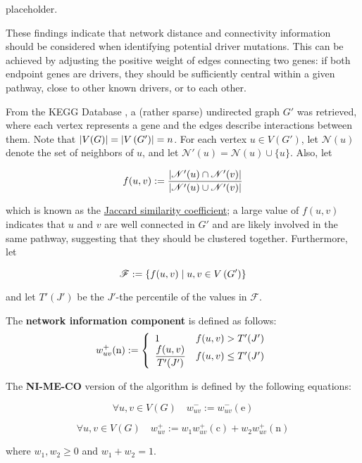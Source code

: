placeholder. 

These findings indicate that network distance and connectivity information should be considered when identifying potential driver mutations. This can be achieved by adjusting the positive weight of edges connecting two genes: if both endpoint genes are drivers, they should be sufficiently central within a given pathway, close to other known drivers, or to each other.

From the KEGG Database \cite{kegg}, a (rather sparse) undirected graph $G'$ was retrieved, where each vertex represents a gene and the edges describe interactions between them. Note that $\abs{V(G)} = \abs{V \left(G' \right)} = n$. For each vertex $u \in V \left(G' \right)$, let $\mathscr{N}(u)$ denote the set of neighbors of $u$, and let $\mathscr{N}'(u) = \mathscr{N}(u) \cup \{u\}$. Also, let

\begin{equation}
    f(u, v) := \dfrac{\abs{\mathscr{N}'(u) \cap \mathscr{N}'(v)}}{\abs{\mathscr{N}'(u) \cup \mathscr{N}'(v)}}
\end{equation}

which is known as the \href{https://en.wikipedia.org/wiki/Jaccard_index}{Jaccard similarity coefficient}; a large value of $f(u, v)$ indicates that $u$ and $v$ are well connected in $G'$ and are likely involved in the same pathway, suggesting that they should be clustered together. Furthermore, let

\begin{equation}
    \mathscr{F} := \{f(u, v) \mid u, v \in V\rbk{G'}\}
\end{equation}

and let $T'(J')$ be the $J'$-the percentile of the values in $\mathscr F$.

\begin{definition}
    The \textbf{network information component} is defined as follows: $$w_{uv}^+(\mathrm n) := \soe{ll}{1 & f(u, v) > T'(J') \\ \dfrac{f(u, v)}{T'(J')} & f(u, v) \le T'(J')}$$
\end{definition}

\begin{definition}[NI-ME-CO]
    The \textbf{NI-ME-CO} version of the algorithm is defined by the following equations:

    \begin{equation}
        \forall u, v \in V(G) \quad w_{uv}^- := w_{uv}^-(\mathrm e)
    \end{equation}

    \begin{equation}
        \forall u, v \in V(G) \quad w_{uv}^+ := w_1 w_{uv}^+(\mathrm c) + w_2 w_{uv}^+(\mathrm n)
    \end{equation}

    where $w_1, w_2 \ge 0$ and $w_1 + w_2 = 1$.
\end{definition}

